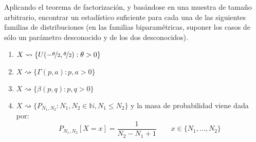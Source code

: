 \begin{ejercicio}
    Aplicando el teorema de factorización, y basándose en una muestra de tamaño arbitrario, encontrar un estadístico suficiente para cada una de las siguientes familias de distribuciones (en las familias biparamétricas, suponer los casos de sólo un parámetro desconocido y de los dos desconocidos).
    \begin{enumerate}[label=\alph*)]
        \item $X\rightsquigarrow\{U(-\nicefrac{\theta}{2},\nicefrac{\theta}{2}) : \theta>0\}$
        \item $X\rightsquigarrow\{\Gamma(p,a) : p,a > 0\}$
        \item $X\rightsquigarrow\{\beta(p,q) : p,q>0\}$
        \item $X\rightsquigarrow\{P_{N_1,N_2} : N_1, N_2 \in \mathbb{N}, N_1 \leq N_2\}$ y la masa de probabilidad viene dada por:
            \begin{equation*}
                P_{N_1, N_2}[X=x] = \dfrac{1}{N_2 - N_1 + 1} \qquad x\in \{N_1, \ldots, N_2\}
            \end{equation*}
    \end{enumerate}


\end{ejercicio}

